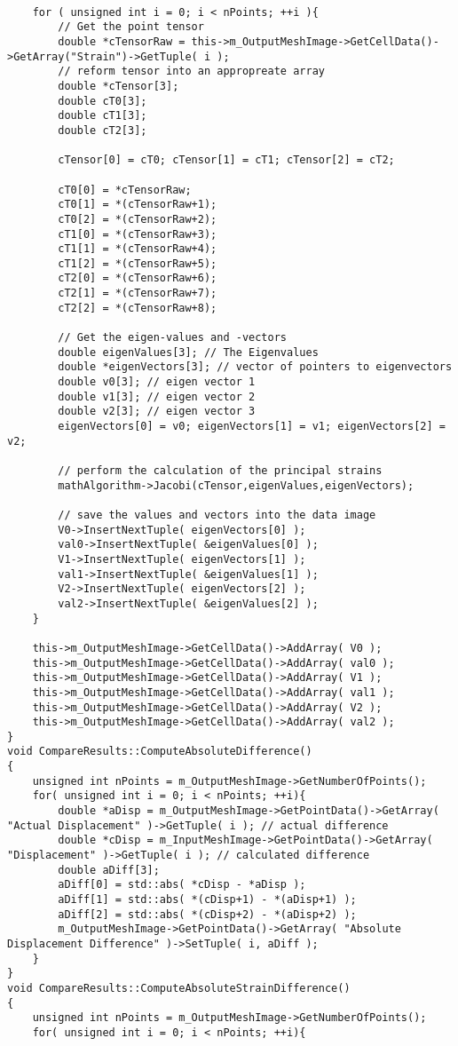 \begin{lstlisting}
	
	for ( unsigned int i = 0; i < nPoints; ++i ){
		// Get the point tensor
		double *cTensorRaw = this->m_OutputMeshImage->GetCellData()->GetArray("Strain")->GetTuple( i );
		// reform tensor into an appropreate array
		double *cTensor[3];
		double cT0[3];
		double cT1[3];
		double cT2[3];

		cTensor[0] = cT0; cTensor[1] = cT1; cTensor[2] = cT2;

		cT0[0] = *cTensorRaw;
		cT0[1] = *(cTensorRaw+1);
		cT0[2] = *(cTensorRaw+2);	
		cT1[0] = *(cTensorRaw+3);
		cT1[1] = *(cTensorRaw+4);
		cT1[2] = *(cTensorRaw+5);
		cT2[0] = *(cTensorRaw+6);
		cT2[1] = *(cTensorRaw+7);
		cT2[2] = *(cTensorRaw+8);
				
		// Get the eigen-values and -vectors
		double eigenValues[3]; // The Eigenvalues
		double *eigenVectors[3]; // vector of pointers to eigenvectors
		double v0[3]; // eigen vector 1
		double v1[3]; // eigen vector 2
		double v2[3]; // eigen vector 3
		eigenVectors[0] = v0; eigenVectors[1] = v1; eigenVectors[2] = v2;
		
		// perform the calculation of the principal strains
		mathAlgorithm->Jacobi(cTensor,eigenValues,eigenVectors);
		
		// save the values and vectors into the data image
		V0->InsertNextTuple( eigenVectors[0] );
		val0->InsertNextTuple( &eigenValues[0] );
		V1->InsertNextTuple( eigenVectors[1] );
		val1->InsertNextTuple( &eigenValues[1] );
		V2->InsertNextTuple( eigenVectors[2] );
		val2->InsertNextTuple( &eigenValues[2] );
	}
	
	this->m_OutputMeshImage->GetCellData()->AddArray( V0 );
	this->m_OutputMeshImage->GetCellData()->AddArray( val0 );
	this->m_OutputMeshImage->GetCellData()->AddArray( V1 );
	this->m_OutputMeshImage->GetCellData()->AddArray( val1 );
	this->m_OutputMeshImage->GetCellData()->AddArray( V2 );
	this->m_OutputMeshImage->GetCellData()->AddArray( val2 );
}
void CompareResults::ComputeAbsoluteDifference()
{
	unsigned int nPoints = m_OutputMeshImage->GetNumberOfPoints();
	for( unsigned int i = 0; i < nPoints; ++i){
		double *aDisp = m_OutputMeshImage->GetPointData()->GetArray( "Actual Displacement" )->GetTuple( i ); // actual difference
		double *cDisp = m_InputMeshImage->GetPointData()->GetArray( "Displacement" )->GetTuple( i ); // calculated difference
		double aDiff[3]; 
		aDiff[0] = std::abs( *cDisp - *aDisp ); 
		aDiff[1] = std::abs( *(cDisp+1) - *(aDisp+1) ); 
		aDiff[2] = std::abs( *(cDisp+2) - *(aDisp+2) );
		m_OutputMeshImage->GetPointData()->GetArray( "Absolute Displacement Difference" )->SetTuple( i, aDiff );
	}
}
void CompareResults::ComputeAbsoluteStrainDifference()
{
	unsigned int nPoints = m_OutputMeshImage->GetNumberOfPoints();
	for( unsigned int i = 0; i < nPoints; ++i){
		

\end{lstlisting}

